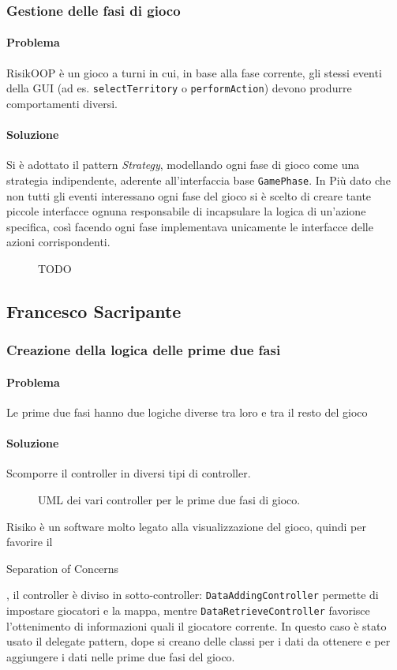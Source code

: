 \documentclass[a4paper,12pt]{report}
\begin{document}
\subsubsection{Gestione delle fasi di gioco}
\paragraph{Problema}
RisikOOP è un gioco a turni in cui, in base alla fase corrente, gli stessi eventi della GUI (ad es. \texttt{selectTerritory} o \texttt{performAction}) devono produrre comportamenti diversi.
\paragraph{Soluzione}
Si è adottato il pattern \textit{Strategy}, modellando ogni fase di gioco come una strategia indipendente, aderente all'interfaccia base \texttt{GamePhase}.
In Più dato che non tutti gli eventi interessano ogni fase del gioco si è scelto di creare tante piccole interfacce ognuna responsabile di incapsulare la logica di un'azione specifica, così facendo ogni fase implementava unicamente le interfacce delle azioni corrispondenti.
\begin{figure}[H]
	\centering
	
	\caption{TODO}
\end{figure}
\subsection{Francesco Sacripante}
\subsubsection{Creazione della logica delle prime due fasi}
\paragraph{Problema}
Le prime due fasi hanno due logiche diverse tra loro e tra il resto del gioco
\paragraph{Soluzione}
Scomporre il controller in diversi tipi di controller.
\begin{figure}[H]
	\centering
	
	\caption{UML dei vari controller per le prime due fasi di gioco.}
\end{figure}
Risiko è un software molto legato alla visualizzazione del gioco, quindi per favorire il \begin{itshape}Separation of Concerns\end{itshape}, il controller è diviso in sotto-controller: \texttt{DataAddingController} permette di impostare giocatori e la mappa, mentre \texttt{DataRetrieveController} favorisce l'ottenimento di informazioni quali il giocatore corrente.
In questo caso è stato usato il delegate pattern, dope si creano delle classi per i dati da ottenere e per aggiungere i dati nelle prime due fasi del gioco.
\end{document}
